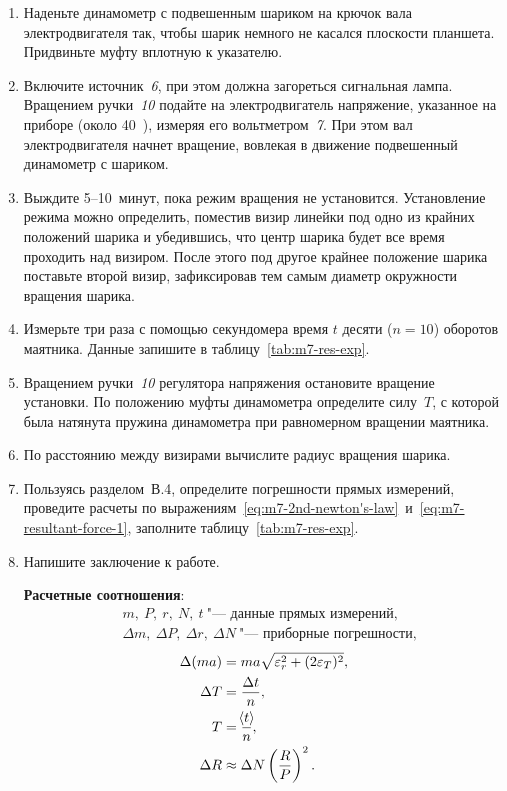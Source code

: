 \documentclass[a4paper, 12pt]{extarticle}
\newcommand{\eps}{\epsilon}
\begin{document}
\begin{enumerate}
\item Наденьте динамометр с подвешенным шариком на крючок вала электродвигателя так, чтобы шарик немного не касался плоскости планшета. Придвиньте муфту вплотную к указателю.
\item Включите источник~\emph{6}, при этом должна загореться сигнальная лампа.  Вращением ручки~\emph{10} подайте на электродвигатель напряжение, указанное на приборе (около 40~), измеряя его вольтметром~\emph{7}. При этом вал электродвигателя начнет вращение, вовлекая в движение подвешенный динамометр с шариком.
\item Выждите 5--10~минут, пока режим вращения не установится. Установление режима можно определить, поместив визир линейки под одно из крайних положений шарика и убедившись, что центр шарика будет все время проходить над визиром. После этого под другое крайнее положение шарика поставьте второй визир, зафиксировав тем самым диаметр окружности вращения шарика.
\item Измерьте три раза с помощью секундомера время $t$ десяти ($n = 10$) оборотов маятника. Данные запишите в таблицу~\ref{tab:m7-res-exp}.
\item Вращением ручки~\emph{10} регулятора напряжения остановите вращение установки. По положению муфты динамометра определите силу~$T$, с которой была натянута пружина динамометра при равномерном вращении маятника.
\item По расстоянию между визирами вычислите радиус вращения шарика.
\item Пользуясь разделом~В.4, определите погрешности прямых измерений, проведите расчеты по выражениям~\eqref{eq:m7-2nd-newton's-law}~и~\eqref{eq:m7-resultant-force-1}, заполните таблицу~\ref{tab:m7-res-exp}.
\item Напишите заключение к работе.

\textbf{Расчетные соотношения}: %
\begin{align*}
&m,\ P,\ r,\ N,\ t\ \text{"--- данные прямых измерений,} \\
&\Delta m,\ \Delta P,\ \Delta r,\ \Delta N\ \text{"--- приборные погрешности,} %
\end{align*} \begin{align*} 
\Delta (ma) &= ma\sqrt{\eps_r^2 + (2\eps_T)^2}, \\ %
\Delta T &= \dfrac{\Delta t}{n}, \\
T &= \dfrac{\MTDMean{t}}{n}, \\
\Delta R &\approx \Delta N \left(\dfrac{R}{P}\right)^2.
\end{align*}
\end{enumerate}
\end{document}
